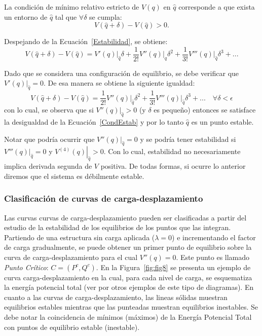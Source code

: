 La condición de mínimo relativo estricto de $V(q)$ en $\hat{q}$ corresponde a que exista un entorno de $\hat{q}$ tal que $\forall \delta$ se cumpla:
%
\begin{equation}\label{CondEstab}
V(\hat{q}+\delta) - V(\hat{q}) > 0.
\end{equation}

Despejando de la Ecuación~\eqref{Estabilidad}, se obtiene:
%
\begin{equation}
V(\hat{q}+\delta) - V(\hat{q}) = \left. V'(q)\right|_{\hat{q}}\delta + \frac{1}{2!} \left.V''(q)\right|_{\hat{q}} \delta^2 +\frac{1}{3!} \left.V'''(q)\right|_{\hat{q}} \delta^3 +... 
\end{equation}

Dado que se considera una configuración de equilibrio, se debe verificar que $\left. V'(q)\right|_{\hat{q}}=0$. %
%
De esa manera se obtiene la siguiente igualdad:
%
\begin{equation}
V(\hat{q}+\delta) - V(\hat{q}) =	\frac{1}{2!} \left.V''(q)\right|_{\hat{q}} \delta^2 +\frac{1}{3!} \left.V'''(q)\right|_{\hat{q}} \delta^3 +...  \quad  \forall \delta < \epsilon
\end{equation}
%
con lo cual, se observa que si $\left.V''(q)\right|_{\hat{q}}>0$ (y $\delta$ es pequeño) entonces se satisface la desigualdad de la Ecuación~\eqref{CondEstab} y por lo tanto $\hat{q}$ es un punto estable.


Notar que podría ocurrir que $\left.V''(q)\right|_{\hat{q}}=0$ y se podría tener estabilidad si $\left.V'''(q)\right|_{\hat{q}}=0$ y $\left.V^{(4)}(q)\right|_{\hat{q}}>0$. Con lo cual, estabilidad no necesariamente implica derivada segunda de $V$ positiva. De todas formas, si ocurre lo anterior diremos que el sistema es débilmente estable.

\subsubsection{Clasificación de curvas de carga-desplazamiento}

Las curvas curvas de carga-desplazamiento pueden ser clasificadas a partir del estudio de la estabilidad de los equilibrios de los puntos que las integran. %
%
Partiendo de una estructura sin carga aplicada ($\lambda=0$) e incrementando el factor de carga gradualmente, se puede obtener un primer punto de equilibrio sobre la curva de carga-desplazamiento para el cual $V''(q)=0$. %
%
Este punto es llamado \textit{Punto Crítico}: $C=(P^c,Q^c)$. %
%
En la Figura~\ref{fig:fig8} se presenta un ejemplo de curva carga-desplazamiento en la cual, para cada nivel de carga, se esquematiza la energía potencial total (ver \citep{thompson1973general} por otros ejemplos de este tipo de diagramas). %
%
En cuanto a las curvas de carga-desplazamiento, las lineas sólidas muestran equilibrios estables mientras que las punteadas muestran equilibrios inestables. Se debe notar la coincidencia de mínimos (máximos) de la Energía Potencial Total con puntos de equilibrio estable (inestable).

